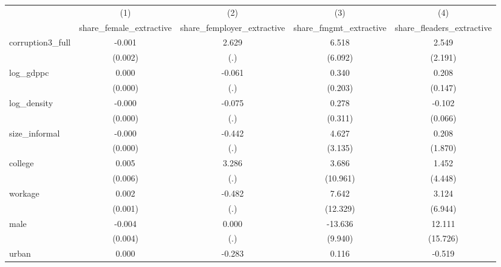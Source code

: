 {
\def\sym#1{\ifmmode^{#1}\else\(^{#1}\)\fi}
\begin{tabular}{l*{4}{c}}
\hline\hline
            &\multicolumn{1}{c}{(1)}&\multicolumn{1}{c}{(2)}&\multicolumn{1}{c}{(3)}&\multicolumn{1}{c}{(4)}\\
            &\multicolumn{1}{c}{share\_female\_extractive}&\multicolumn{1}{c}{share\_femployer\_extractive}&\multicolumn{1}{c}{share\_fmgmt\_extractive}&\multicolumn{1}{c}{share\_fleaders\_extractive}\\
\hline
corruption3\_full&      -0.001         &       2.629         &       6.518         &       2.549         \\
            &     (0.002)         &         (.)         &     (6.092)         &     (2.191)         \\
[1em]
log\_gdppc   &       0.000         &      -0.061         &       0.340         &       0.208         \\
            &     (0.000)         &         (.)         &     (0.203)         &     (0.147)         \\
[1em]
log\_density &      -0.000         &      -0.075         &       0.278         &      -0.102         \\
            &     (0.000)         &         (.)         &     (0.311)         &     (0.066)         \\
[1em]
size\_informal&      -0.000         &      -0.442         &       4.627         &       0.208         \\
            &     (0.000)         &         (.)         &     (3.135)         &     (1.870)         \\
[1em]
college     &       0.005         &       3.286         &       3.686         &       1.452         \\
            &     (0.006)         &         (.)         &    (10.961)         &     (4.448)         \\
[1em]
workage     &       0.002         &      -0.482         &       7.642         &       3.124         \\
            &     (0.001)         &         (.)         &    (12.329)         &     (6.944)         \\
[1em]
male        &      -0.004         &       0.000         &     -13.636         &      12.111         \\
            &     (0.004)         &         (.)         &     (9.940)         &    (15.726)         \\
[1em]
urban       &       0.000         &      -0.283         &       0.116         &      -0.519         \\

\end{tabular}}
